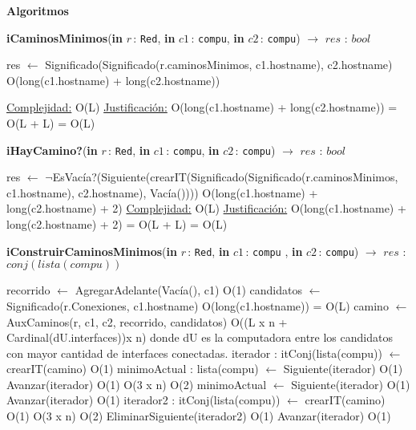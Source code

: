 \documentclass[a4paper,10pt]{article}
\let\TipoVariable=\texttt
\let\ModificadorArgumento=\textbf
\newcommand{\In}[2]{\ModificadorArgumento{in} \ensuremath{#1}\,: \TipoVariable{#2}\xspace}
\newenvironment{Algoritmos}{%
  \vspace*{2ex}%
  \noindent\textbf{\Large Algoritmos}%
  \vspace*{2ex}%
}{}
\begin{document}
\begin{Algoritmos}
\begin{algorithm}[H]{\textbf{iCaminosMinimos}(\In {r}{Red}, \In {c1}{compu}, \In {c2}{compu}) $\to$ $res$ : $bool$} 
	\begin{algorithmic}
			\State res $\gets$ Significado(Significado(r.caminosMinimos, c1.hostname), c2.hostname) 		\Comment O(long(c1.hostname) + long(c2.hostname))
			 
			\medskip
			\Statex \underline{Complejidad:} O(L)
			\Statex \underline{Justificación:} O(long(c1.hostname) + long(c2.hostname)) = O(L + L) = O(L)
    	\end{algorithmic}
\end{algorithm}

\begin{algorithm}[H]{\textbf{iHayCamino?}(\In {r}{Red}, \In {c1}{compu}, \In {c2}{compu}) $\to$ $res$ : $bool$} 
	\begin{algorithmic}

			\State res $\gets$ $\neg$EsVac\'ia?(Siguiente(crearIT(Significado(Significado(r.caminosMinimos, c1.hostname), c2.hostname), Vac\'ia()))) \Comment O(long(c1.hostname) + long(c2.hostname) + 2)
			\medskip
			\Statex \underline{Complejidad:} O(L)
			\Statex \underline{Justificación:} O(long(c1.hostname) + long(c2.hostname) + 2) = O(L + L) = O(L)
    	\end{algorithmic}
\end{algorithm}

\begin{algorithm}[H]{\textbf{iConstruirCaminosMinimos}(\In {r}{Red}, \In {c1}{compu} , \In {c2}{compu}) $\to$ $res$ : $conj(lista(compu))$} 
	\begin{algorithmic}
	
	\State recorrido $\gets$ AgregarAdelante(Vac\'ia(), c1)  		\Comment O(1)
	\State candidatos $\gets$ Significado(r.Conexiones, c1.hostname)   \Comment O(long(c1.hostname)) = O(L)
	\State camino $\gets$ AuxCaminos(r, c1, c2, recorrido, candidatos) 	\Comment O((L x n + Cardinal(dU.interfaces))x n) donde dU es la computadora entre los candidatos con mayor cantidad de interfaces conectadas.
	\State iterador : itConj(lista(compu)) $\gets$ crearIT(camino) 	\Comment O(1)
	\State minimoActual : lista(compu) $\gets$ Siguiente(iterador) 	\Comment O(1)
	\State Avanzar(iterador) 					\Comment O(1)
	 					\Comment O(3 x n)
	   	\Comment O(2)
	    \State minimoActual $\gets$ Siguiente(iterador) 		\Comment O(1)
	  \EndIf
	  \State Avanzar(iterador) 					\Comment O(1)
	\EndWhile 
	\State iterador2 : itConj(lista(compu)) $\gets$ crearIT(camino) 	\Comment O(1)
	 				\Comment O(3 x n)
	    	\Comment O(2)
	    \State EliminarSiguiente(iterador2) 			 \Comment O(1)
	  \Else
	    \State Avanzar(iterador) 					\Comment O(1)
	  \EndIf


\end{algorithmic}
\end{algorithm}
\end{Algoritmos}
\end{document}
